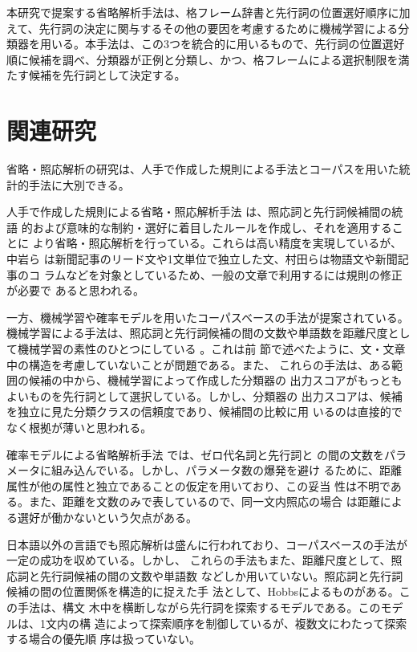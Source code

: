 \documentclass{nlp}
\begin{document}
本研究で提案する省略解析手法は、格フレーム辞書と先行詞の位置選好順序に加
えて、先行詞の決定に関与するその他の要因を考慮するために機械学習による分
類器を用いる。本手法は、この3つを統合的に用いるもので、先行詞の位置選好
順に候補を調べ、分類器が正例と分類し、かつ、格フレームによる選択制限を満
たす候補を先行詞として決定する。


\section{関連研究}

省略・照応解析の研究は、人手で作成した規則による手法とコーパスを用いた統
計的手法に大別できる。

人手で作成した規則による省略・照応解析手法
\cite{Nakaiwa1993,Nakaiwa1996,Murata1997}は、照応詞と先行詞候補間の統語
的および意味的な制約・選好に着目したルールを作成し、それを適用することに
より省略・照応解析を行っている。これらは高い精度を実現しているが、中岩ら
は新聞記事のリード文や1文単位で独立した文、村田らは物語文や新聞記事のコ
ラムなどを対象としているため、一般の文章で利用するには規則の修正が必要で
あると思われる。

一方、機械学習や確率モデルを用いたコーパスベースの手法が提案されている。
機械学習による手法は、照応詞と先行詞候補の間の文数や単語数を距離尺度とし
て機械学習の素性のひとつにしている \cite{Aone1995,Yoshino2001}。これは前
節で述べたように、文・文章中の構造を考慮していないことが問題である。また、
これらの手法は、ある範囲の候補の中から、機械学習によって作成した分類器の
出力スコアがもっともよいものを先行詞として選択している。しかし、分類器の
出力スコアは、候補を独立に見た分類クラスの信頼度であり、候補間の比較に用
いるのは直接的でなく根拠が薄いと思われる。

確率モデルによる省略解析手法 \cite{Seki2002b}では、ゼロ代名詞と先行詞と
の間の文数をパラメータに組み込んでいる。しかし、パラメータ数の爆発を避け
るために、距離属性が他の属性と独立であることの仮定を用いており、この妥当
性は不明である。また、距離を文数のみで表しているので、同一文内照応の場合
は距離による選好が働かないという欠点がある。

日本語以外の言語でも照応解析は盛んに行われており、コーパスベースの手法が
一定の成功を収めている\cite{Ge1998,Soon2001,Muller2002,Ng2002a}。しかし、
これらの手法もまた、距離尺度として、照応詞と先行詞候補の間の文数や単語数
などしか用いていない。照応詞と先行詞候補の間の位置関係を構造的に捉えた手
法として、Hobbsによるものがある\cite{Hobbs1978,Ge1998}。この手法は、構文
木中を横断しながら先行詞を探索するモデルである。このモデルは、1文内の構
造によって探索順序を制御しているが、複数文にわたって探索する場合の優先順
序は扱っていない。
\end{document}
